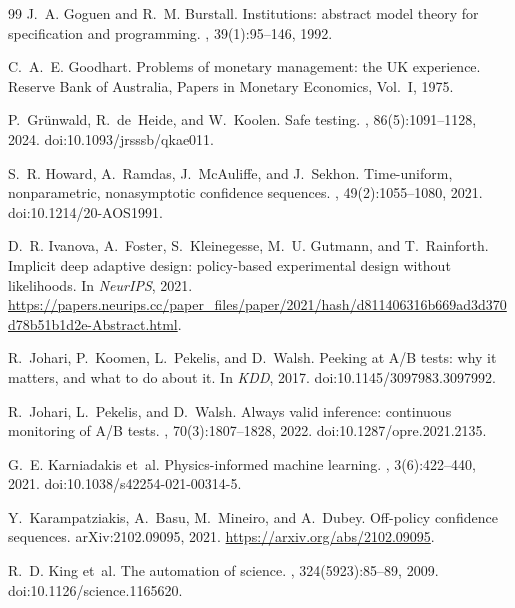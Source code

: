 \documentclass[11pt,a4paper]{article}
\begin{document}
\begin{thebibliography}{99}
J.~A. Goguen and R.~M. Burstall.
\newblock Institutions: abstract model theory for specification and programming.
, 39(1):95--146, 1992.

C.~A.~E. Goodhart.
\newblock Problems of monetary management: the {UK} experience.
\newblock Reserve Bank of Australia, Papers in Monetary Economics, Vol.~I, 1975.

P.~Gr{\"u}nwald, R.~de~Heide, and W.~Koolen.
\newblock Safe testing.
, 86(5):1091--1128, 2024. doi:10.1093/jrsssb/qkae011.

S.~R. Howard, A.~Ramdas, J.~McAuliffe, and J.~Sekhon.
\newblock Time-uniform, nonparametric, nonasymptotic confidence sequences.
, 49(2):1055--1080, 2021. doi:10.1214/20-AOS1991.

D.~R. Ivanova, A.~Foster, S.~Kleinegesse, M.~U. Gutmann, and T.~Rainforth.
\newblock Implicit deep adaptive design: policy-based experimental design without likelihoods.
\newblock In {\em NeurIPS}, 2021.
\newblock \url{https://papers.neurips.cc/paper_files/paper/2021/hash/d811406316b669ad3d370d78b51b1d2e-Abstract.html}.

R.~Johari, P.~Koomen, L.~Pekelis, and D.~Walsh.
\newblock Peeking at {A/B} tests: why it matters, and what to do about it.
\newblock In {\em KDD}, 2017. doi:10.1145/3097983.3097992.

R.~Johari, L.~Pekelis, and D.~Walsh.
\newblock Always valid inference: continuous monitoring of {A/B} tests.
, 70(3):1807--1828, 2022. doi:10.1287/opre.2021.2135.

G.~E. Karniadakis et~al.
\newblock Physics-informed machine learning.
, 3(6):422--440, 2021. doi:10.1038/s42254-021-00314-5.

Y.~Karampatziakis, A.~Basu, M.~Mineiro, and A.~Dubey.
\newblock Off-policy confidence sequences.
\newblock arXiv:2102.09095, 2021.
\newblock \url{https://arxiv.org/abs/2102.09095}.

R.~D. King et~al.
\newblock The automation of science.
, 324(5923):85--89, 2009. doi:10.1126/science.1165620.


\end{thebibliography}
\end{document}

